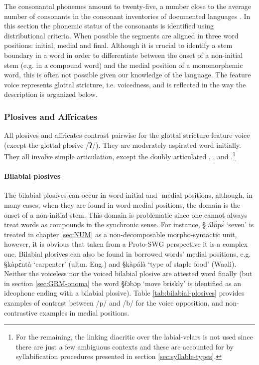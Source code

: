 The consonantal phonemes amount to twenty-five, a number close to the average
number of consonants in the consonant inventories of  documented  languages
\citep{Madd09}. In this section the phonemic status of the consonants is
identified using distributional criteria. When possible the segments are aligned
in three word positions:  initial, medial  and final. Although it is crucial to
identify a stem boundary in a word in order to differentiate between the onset
of a non-initial stem (e.g. in a compound word) and the medial position of a
monomorphemic word,  this
  is often not possible given our knowledge of the language. The feature
{\sc voice} represents glottal stricture, i.e. voicedness, and is reflected in
the way  the description is organized below.

   
\subsubsection{Plosives and Affricates}

All plosives and affricates contrast pairwise for the glottal stricture feature 
{\sc voice} (except  the glottal plosive {\I /ʔ/}). They are moderately
aspirated word initially. They all involve simple articulation, except  the
doubly articulated {\I [d͡ʒ]}, {\I [t͡ʃ]}, {\I [k͡p]} and {\I
[g͡b]}.\footnote{For the remaining,  the linking diacritic over
the labial-velars is not used  since there are just a few ambiguous contexts
and these
are accounted for by syllabification procedures presented in  section
\ref{sec:syllable-types}.}

\paragraph{Bilabial plosives}

The bilabial plosives can occur in word-initial and -medial positions, although,
in many  cases, when they are found in  word-medial positions, the domain  is
the onset of a non-initial stem. This domain is problematic since one cannot
always treat words as compounds in the synchronic sense. For instance, {\S
álʊ̀pɛ̀} `seven' is treated in chapter \ref{sec:NUM} as a  non-decomposable
morpho-syntactic unit, however,  it is obvious that taken from a Proto-SWG
perspective it is  a complex one. Bilabial plosives  can also be  found in
borrowed words' medial positions, e.g. {\S kàpɛ̀ntà} `carpenter' (ultm. Eng.)
and {\S kàpálà} `type of staple food' (Waali).  Neither the voiceless nor the
voiced bilabial plosive are attested word finally (but in  section
\ref{sec:GRM-onoma}  the word {\S fɔbɔp} `move briskly'  is identified as an
ideophone ending with a bilabial  plosive). Table \ref{tab:bilabial-plosives}
provides examples of contrast between /p/ and /b/ for the {\sc voice}
opposition, and non-contrastive examples  in medial positions.


